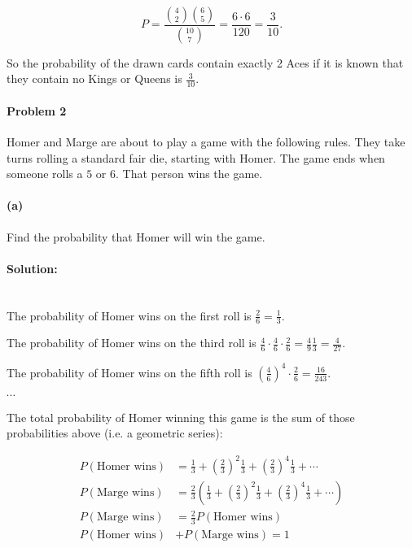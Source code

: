 \documentclass[a4paper, 11pt, twoside]{article}
\begin{document}
\[P=\frac{{4 \choose 2}{6 \choose 5}}{{10 \choose 7}}=\frac{6\cdot 6}{120}=\frac3{10}.\]

So the probability of the drawn cards contain exactly 2 Aces if it is known that they contain no Kings or Queens is $\frac3{10}.$\\

\pagebreak

\paragraph{Problem 2}

Homer and Marge are about to play a game with the following rules. They take turns rolling a standard fair die, starting with Homer. The game ends when someone rolls a $5$ or $6$. That person wins the game.

\paragraph{(a)} Find the probability that Homer will win the game.

\paragraph{Solution:}\ \\

The probability of Homer wins on the first roll is $\frac{2}{6}=\frac13$.

The probability of Homer wins on the third roll is $\frac{4}{6}\cdot\frac{4}{6}\cdot\frac{2}{6}=\frac{4}{9}\frac{1}{3}=\frac{4}{27}.$

The probability of Homer wins on the fifth roll is $\left(\frac{4}{6}\right)^4\cdot\frac{2}{6}=\frac{16}{243}.$

$\cdots$

The total probability of Homer winning this game is the sum of those probabilities above (i.e. a geometric series):

\[
\begin{split}
	P(\text{Homer wins})&=\frac13 + \left(\frac23\right)^2\frac13 + \left(\frac23\right)^4\frac13 + \cdots\\
	P(\text{Marge wins})&=\frac{2}{3}\left(\frac13 + \left(\frac23\right)^2\frac13 + \left(\frac23\right)^4\frac13 + \cdots\right)\\
	P(\text{Marge wins}) &= \frac{2}{3}P(\text{Homer wins})\\
	P(\text{Homer wins})&+P(\text{Marge wins}) = 1
\end{split}
\]
\end{document}
